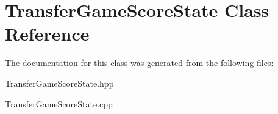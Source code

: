 \hypertarget{class_transfer_game_score_state}{}\section{Transfer\+Game\+Score\+State Class Reference}
\label{class_transfer_game_score_state}


The documentation for this class was generated from the following files\+:\begin{DoxyCompactItemize}
\item 
Transfer\+Game\+Score\+State.\+hpp\item 
Transfer\+Game\+Score\+State.\+cpp\end{DoxyCompactItemize}
